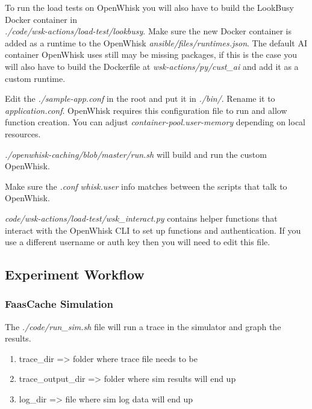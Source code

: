 To run the load tests on OpenWhisk you will also have to build the LookBusy Docker container in \\
{\em ./code/wsk-actions/load-test/lookbusy}.
Make sure the new Docker container is added as a runtime to the OpenWhisk {\em ansible/files/runtimes.json}.
The default AI container OpenWhisk uses still may be missing packages, if this is the case you will also have to build the Dockerfile at {\em wsk-actions/py/cust\_ai} and add it as a custom runtime.

Edit the {\em ./sample-app.conf} in the root and put it in {\em ./bin/}.
Rename it to {\em application.conf}.
OpenWhisk requires this configuration file to run and allow function creation.
You can adjust {\em container-pool.user-memory} depending on local resources.

{\em ./openwhisk-caching/blob/master/run.sh} will build and run the custom OpenWhisk.

Make sure the {\em .conf} {\em whisk.user} info matches between the scripts that talk to OpenWhisk.

{\em code/wsk-actions/load-test/wsk\_interact.py} contains helper functions that interact with the OpenWhisk CLI to set up functions and authentication.
If you use a different username or auth key then you will need to edit this file.

\subsection{Experiment Workflow} \label{experiments}


\subsubsection{FaasCache Simulation}

The {\em ./code/run\_sim.sh} file will run a trace in the simulator and graph the results.

\begin{enumerate} [label=Step \arabic{enumi}.,ref=Step \arabic{enumi}, leftmargin=*]
  \item trace\_dir => folder where trace file needs to be
  \item trace\_output\_dir => folder where sim results will end up
  \item log\_dir => file where sim log data will end up
\end{enumerate}

